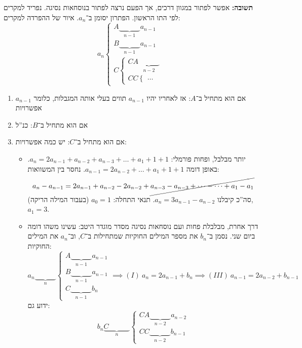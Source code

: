 \documentclass[]{article}
\begin{document}
	\textbf{תשובה: }אפשר לפתור במגוון דרכים, אך הפעם נרצה לפתור בנוסחאות נסיגה. נפריד למקרים לפי התו הראשון. הפתרון יסומן ב־$a_n$. 
	איור של ההפרדה למקרים: 
	\[ a_n \begin{cases}
		A\underbrace{\quad \quad \quad}_{n - 1} a_{n - 1} \\
		B\underbrace{\quad \quad \quad}_{n - 1} a_{n - 1} \\
		C\begin{cases}
			CA\underbrace{\quad \quad \quad}_{n - 2} \\
			CC \begin{cases}
				\dots
			\end{cases}
		\end{cases}
	\end{cases} \]
	\begin{enumerate}
		\item אם הוא מתחיל ב־$A$: אז לאחריו יהיו $a_{n - 1}$ תווים בעלי אותה המגבלות, כלומר $a_{n - 1}$ אפשרויות 
		\item אם הוא מתחיל ב־$B$: כנ''ל
		\item אם הוא מתחיל ב־$C$: יש כמה אפשרויות: 
		\begin{itemize}
			\item יותר מבלבל, ופחות פורמלי: $a_n = 2a_{n - 1} + a_{n - 2} + a_{n - 3} + \dots + a_1 + 1 + 1$. באופן דומה $a_{n - 1} = 2a_{n - 2} + \dots + a_1 + 1 + 1$. נחסר בין המשוואות: 
			\[ a_n - a_{n - 1} = 2a_{n - 1} + a_{n - 2} - 2a_{n - 2} + \cancel{a_{n - 3} - a_{n - 3} + \dots - \dots + a_1 - a_1 } \]
			סה''כ קיבלנו $a_n = 3a_{n - 1} - a_{n - 2} $. 
			תנאי התחלה: $a_0 = 1 $ (בעבור המילה הריקה), $a_1 = 3 $. 
			\item דרך אחרת, מבלבלת פחות ועם נוסחאות נסיגה מסדר מוגדר היטב: עשינו משהו דומה ביום שני. נסמן ב־$b_n$ את מספר המילים החוקיות שמתחילות ב־$C$, וב־$a_n$ את המילים החוקיות: 
			\[ a_n \underbrace{\quad \quad \quad}_{n}\begin{cases}
				A \underbrace{\quad \quad \quad}_{n - 1} a_{n - 1} \\
				B \underbrace{\quad \quad \quad }_{n - 1} a_{n - 1} \\
				C \underbrace{\quad \quad \quad}_{n - 1} b_n
			\end{cases} \implies (I) \ a_n = 2a_{n - 1} + b_n \implies (III) \ a_{n - 1} = 2a_{n - 2} + b_{n - 1} \]
			ידוע גם: 
			\[ b_n \underbrace{C\quad \quad \quad}_{n} \begin{cases}
				CA\underbrace{\quad \quad \quad}_{n - 2} a_{n - 2} \\
				CC\underbrace{\quad \quad \quad}_{n - 2} b_{n - 1}

\end{cases}\]
\end{itemize}
\end{enumerate}
\end{document}
